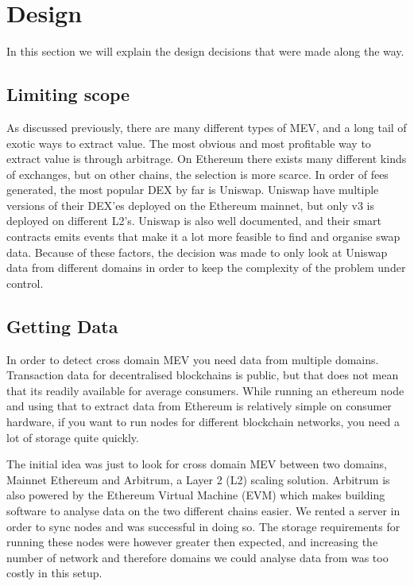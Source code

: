 \section{Design}

In this section we will explain the design decisions that were made along the way.

\subsection{Limiting scope}

As discussed previously, there are many different types of MEV, and a long tail of exotic ways to extract value. The most obvious and most profitable way to extract value is through arbitrage. On Ethereum there exists many different kinds of exchanges, but on other chains, the selection is more scarce. In order of fees generated, the most popular DEX by far is Uniswap\cite{cryptofees}. Uniswap have multiple versions of their DEX'es deployed on the Ethereum mainnet, but only v3 is deployed on different L2's. Uniswap is also well documented, and their smart contracts emits events that make it a lot more feasible to find and organise swap data. Because of these factors, the decision was made to only look at Uniswap data from different domains in order to keep the complexity of the problem under control.

\subsection{Getting Data}
In order to detect cross domain MEV you need data from multiple domains. Transaction data for decentralised blockchains is public, but that does not mean that its readily available for average consumers. While running an ethereum node and using that to extract data from Ethereum is relatively simple on consumer hardware, if you want to run nodes for different blockchain networks, you need a lot of storage quite quickly. 

The initial idea was just to look for cross domain MEV between two domains, Mainnet Ethereum and Arbitrum, a Layer 2 (L2) scaling solution. Arbitrum \cite{arbitrum} is also powered by the Ethereum Virtual Machine (EVM) which makes building software to analyse data on the two different chains easier. We rented a server in order to sync nodes and was successful in doing so. The storage requirements for running these nodes were however greater then expected, and increasing the number of network and therefore domains we could analyse data from was too costly in this setup. 

